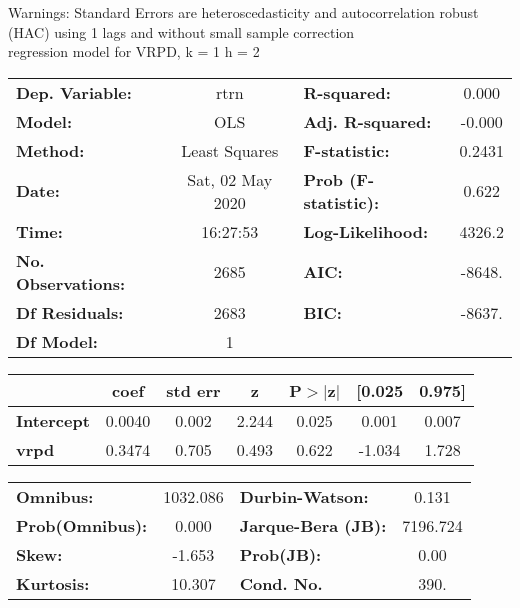 Warnings: \newline
 [1] Standard Errors are heteroscedasticity and autocorrelation robust (HAC) using 1 lags and without small sample correction\\ 

regression model for VRPD, k = 1 h = 2\begin{center}
\begin{tabular}{lclc}
\toprule
\textbf{Dep. Variable:}    &       rtrn       & \textbf{  R-squared:         } &     0.000   \\
\textbf{Model:}            &       OLS        & \textbf{  Adj. R-squared:    } &    -0.000   \\
\textbf{Method:}           &  Least Squares   & \textbf{  F-statistic:       } &    0.2431   \\
\textbf{Date:}             & Sat, 02 May 2020 & \textbf{  Prob (F-statistic):} &    0.622    \\
\textbf{Time:}             &     16:27:53     & \textbf{  Log-Likelihood:    } &    4326.2   \\
\textbf{No. Observations:} &        2685      & \textbf{  AIC:               } &    -8648.   \\
\textbf{Df Residuals:}     &        2683      & \textbf{  BIC:               } &    -8637.   \\
\textbf{Df Model:}         &           1      & \textbf{                     } &             \\
\bottomrule
\end{tabular}
\begin{tabular}{lcccccc}
                   & \textbf{coef} & \textbf{std err} & \textbf{z} & \textbf{P$> |$z$|$} & \textbf{[0.025} & \textbf{0.975]}  \\
\midrule
\textbf{Intercept} &       0.0040  &        0.002     &     2.244  &         0.025        &        0.001    &        0.007     \\
\textbf{vrpd}      &       0.3474  &        0.705     &     0.493  &         0.622        &       -1.034    &        1.728     \\
\bottomrule
\end{tabular}
\begin{tabular}{lclc}
\textbf{Omnibus:}       & 1032.086 & \textbf{  Durbin-Watson:     } &    0.131  \\
\textbf{Prob(Omnibus):} &   0.000  & \textbf{  Jarque-Bera (JB):  } & 7196.724  \\
\textbf{Skew:}          &  -1.653  & \textbf{  Prob(JB):          } &     0.00  \\
\textbf{Kurtosis:}      &  10.307  & \textbf{  Cond. No.          } &     390.  \\
\bottomrule
\end{tabular}
\end{center}

